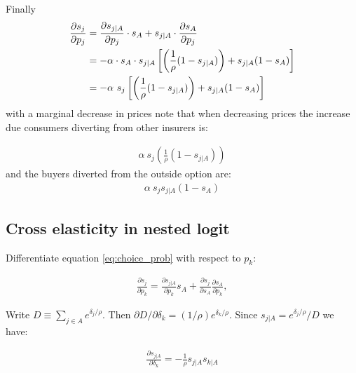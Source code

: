 \documentclass[12pt]{article}
\theoremstyle{plain}
\theoremstyle{plain}
\begin{document}
Finally 
\begin{align}\label{eq:a5}
    \frac{\partial s_j}{\partial p_j} &= \frac{\partial s_{j|A}}{\partial p_j} \cdot s_A + s_{j|A} \cdot \frac{\partial s_A}{\partial p_j} \notag \\
    &= -\alpha \cdot s_A \cdot s_{j|A}\left[ \left(\frac{1}{\rho}(1-s_{j|A})\right)  + s_{j|A}  (1-s_A) \right] \notag \\
    &= -\alpha \ s_j \left[ \left(\frac{1}{\rho}(1-s_{j|A})\right)  + s_{j|A}  (1-s_A) \right]  
\end{align}
with a marginal decrease in prices 
note that when decreasing prices the increase due consumers diverting from other insurers is: 

\begin{align}\label{eq:a6}
    \alpha \ s_j  \left(\frac{1}{\rho}(1-s_{j|A})\right)    
\end{align}
and the buyers diverted from the outside option are: 
\begin{align}\label{eq:a7}
    \alpha \ s_j  s_{j|A}  (1-s_A)  
\end{align}

\bigskip


\subsection{Cross elasticity in nested logit}\label{sec:appendix1.1}


Differentiate  equation \ref{eq:choice_prob} with respect to $p_k$: 

\begin{align}\label{eq:app1}
    \frac{\partial s_j}{\partial p_k} = \frac{\partial s_{j|A}}{\partial p_k}s_A + \frac{\partial s_j}{\partial s_A}\frac{\partial s_A}{\partial p_k}, 
\end{align}



Write $D \equiv \sum_{j \in A} e^{\delta_j/\rho}$. Then  $\partial D/\partial\delta_k = (1/\rho)e^{\delta_k/\rho}$. Since $s_{j|A} = e^{\delta_j/\rho}/D$  we have: 

\begin{align}
    \frac{\partial s_{j|A}}{\partial \delta_k} %
    =-\frac{1}{\rho}s_{j|A}s_{k|A}
\end{align}
\end{document}
